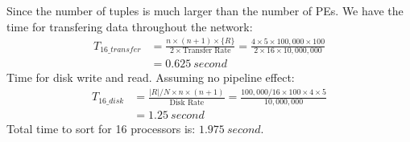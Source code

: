 \documentclass[a4paper,12pt]{article}
\begin{document}
Since the number of tuples is much larger than the number of PEs. We have the time for transfering data throughout the network:
\begin{equation*}
	\begin{aligned}
		T_{16\_transfer} & = \frac{n \times (n+1) \times \{R\}}{2 \times \mbox{Transfer Rate}}
		 = \frac{4 \times 5 \times 100,000 \times 100}{2 \times 16 \times 10,000,000} \\
		& = 0.625\ second
	\end{aligned}
\end{equation*}
Time for disk write and read. Assuming no pipeline effect:
\begin{equation*}
	\begin{aligned}
		 T_{16\_disk} & = \frac{|R| / N \times n \times (n + 1)}{\mbox{Disk Rate}}
					  = \frac{100,000 / 16 \times 100 \times 4 \times 5}{10,000,000} \\
					 & = 1.25\ second
	\end{aligned}
\end{equation*}
Total time to sort for 16 processors is: $1.975\ second$. \\
\end{document}
